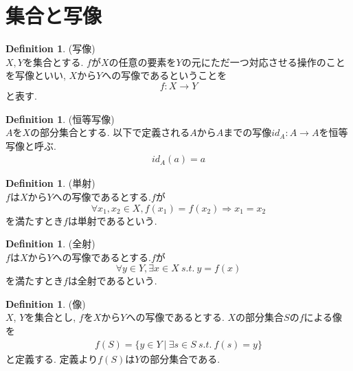 \documentclass[11pt, a4paper, dvipdfmx]{jsbook}
\theoremstyle{definition}
\newtheorem{Definition+}[Axiom+]{Definition}
\begin{document}
\section{集合と写像}
\begin{Definition+}(写像)\\
  $X, Y$を集合とする.
  $f$が$X$の任意の要素を$Y$の元にただ一つ対応させる操作のことを写像といい, $X$から$Y$への写像であるということを
  \begin{equation*}
    f : X \to Y
  \end{equation*}
  と表す.
\end{Definition+}
\begin{Definition+}(恒等写像)\\
  $A$を$X$の部分集合とする. 以下で定義される$A$から$A$までの写像$id_{A}:A\to A$を恒等写像と呼ぶ.
  \begin{align*}
    id_{A}(a) = a
  \end{align*}
\end{Definition+}
\begin{Definition+}(単射)\\
  $f$は$X$から$Y$への写像であるとする.$f$が
  \begin{equation*}
    \forall x_{1}, x_{2}\in X, f(x_{1}) = f(x_{2}) \Longrightarrow x_{1} = x_{2}
  \end{equation*}
  を満たすとき$f$は単射であるという.
\end{Definition+}
\begin{Definition+}(全射)\\
  $f$は$X$から$Y$への写像であるとする.$f$が
  \begin{equation*}
    \forall y \in Y, \exists x\in X ~s.t.~ y = f(x)
  \end{equation*}
  を満たすとき$f$は全射であるという.
\end{Definition+}
\begin{Definition+}(像)\\
  $X$, $Y$を集合とし, $f$を$X$から$Y$への写像であるとする. $X$の部分集合$S$の$f$による像を
  \begin{align*}
    f(S) = \{y\in Y~|~ \exists s\in S~s.t.~ f(s) = y\}
  \end{align*}
  と定義する. 定義より$f(S)$は$Y$の部分集合である.
\end{Definition+}
\end{document}
